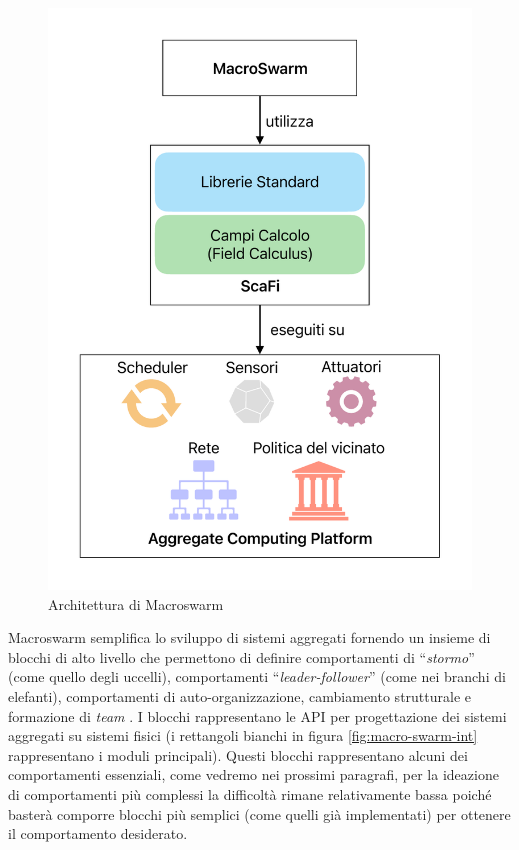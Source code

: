 \documentclass[12pt,a4paper,openright,twoside]{book}
\begin{document}
\begin{figure}
    \centering
    \includegraphics[width=.8\linewidth]{figures/macroSwarm-arc.pdf}
    \caption{Architettura di Macroswarm}
    \label{fig:macro-swarm-arc}
\end{figure}

Macroswarm semplifica lo sviluppo di sistemi aggregati fornendo un insieme di blocchi di alto livello che permettono di definire comportamenti di ``\textit{stormo}'' (come quello degli uccelli), comportamenti ``\textit{leader-follower}'' (come nei branchi di elefanti), comportamenti di auto-organizzazione, cambiamento strutturale e formazione di \textit{team} \cite{Macroswarm}.
I blocchi rappresentano le API per progettazione dei sistemi aggregati su sistemi fisici (i rettangoli bianchi in figura \ref{fig:macro-swarm-int} rappresentano i moduli principali). Questi blocchi rappresentano alcuni dei comportamenti essenziali, come vedremo nei prossimi paragrafi, per la ideazione di comportamenti più complessi la difficoltà rimane relativamente bassa poiché basterà comporre blocchi più semplici (come quelli già implementati) per ottenere il comportamento desiderato.
\end{document}

